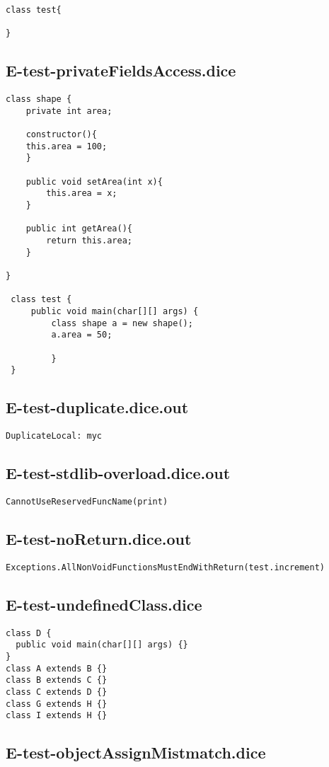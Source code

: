 \begin{verbatim}
class test{
	
}
\end{verbatim}\pagebreak\subsection{E-test-privateFieldsAccess.dice}
\begin{verbatim}
class shape {
	private int area;

	constructor(){
	this.area = 100;
	}

	public void setArea(int x){
		this.area = x;
	}

	public int getArea(){
		return this.area;
	}
	
}

 class test {
	 public void main(char[][] args) {
		 class shape a = new shape();
		 a.area = 50;
		 
		 }
 }
\end{verbatim}\pagebreak\subsection{E-test-duplicate.dice.out}
\begin{verbatim}
DuplicateLocal: myc

\end{verbatim}\pagebreak\subsection{E-test-stdlib-overload.dice.out}
\begin{verbatim}
CannotUseReservedFuncName(print)

\end{verbatim}\pagebreak\subsection{E-test-noReturn.dice.out}
\begin{verbatim}
Exceptions.AllNonVoidFunctionsMustEndWithReturn(test.increment)

\end{verbatim}\pagebreak\subsection{E-test-undefinedClass.dice}
\begin{verbatim}
class D {
  public void main(char[][] args) {}
}
class A extends B {}
class B extends C {}
class C extends D {}
class G extends H {}
class I extends H {}
\end{verbatim}\pagebreak\subsection{E-test-objectAssignMistmatch.dice}
